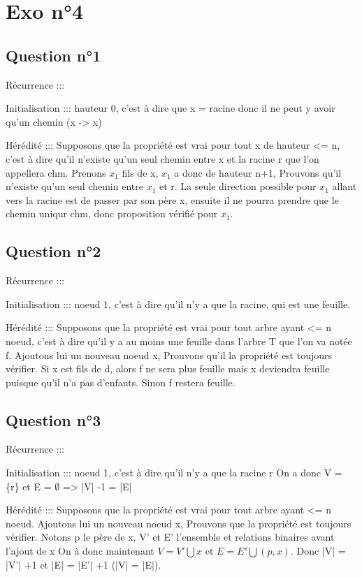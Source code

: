 \documentclass[11pt]{article}
\begin{document}
\section{Exo n°4}
\label{sec:org3d7c0b2}

\subsection{Question n°1}
\label{sec:org38a40ae}

Récurrence ::: 

Initialisation :::
hauteur 0, c'est à dire que x = racine donc il ne peut y avoir qu'un chemin (x -> x)

Hérédité :::
Supposons que la propriété est vrai pour tout x de hauteur <= n, c'est à dire qu'il n'existe qu'un seul chemin entre x et la racine r que l'on appellera chm.
Prenons \(x_1\) fils de x, \(x_1\) a donc de hauteur n+1, Prouvons qu'il n'existe qu'un seul chemin entre \(x_1\) et r.
La seule direction possible pour \(x_1\) allant vers la racine est de passer par son père x, ensuite il ne pourra prendre que le chemin uniqur chm, donc proposition vérifié pour \(x_1\).

\subsection{Question n°2}
\label{sec:org59f252b}

Récurrence ::: 

Initialisation :::
noeud 1, c'est à dire qu'il n'y a que la racine, qui est une feuille.

Hérédité :::
Supposons que la propriété est vrai pour tout arbre ayant <= n noeud, c'est à dire qu'il y a au moins une feuille dans l'arbre T que l'on va notée f.
Ajoutons lui un nouveau noeud x, Prouvons qu'il la propriété est toujours vérifier.
Si x est fils de d, alors f ne sera plus feuille mais x deviendra feuille puisque qu'il n'a pas d'enfants. Sinon f restera feuille. 

\subsection{Question n°3}
\label{sec:org91be3b2}

Récurrence ::: 

Initialisation :::
noeud 1, c'est à dire qu'il n'y a que la racine r
On a donc V = \{r\} et E = \(\emptyset\) => |V| -1 = |E|

Hérédité :::
Supposons que la propriété est vrai pour tout arbre ayant <= n noeud.
Ajoutons lui un nouveau noeud x, Prouvons que la propriété est toujours vérifier.
Notons p le père de x, V' et E' l'ensemble et relations binaires avant l'ajout de x
On à donc maintenant \(V = V' \bigcup {x}\) et \(E = E' \bigcup (p,x)\).
Donc |V| = |V'| +1 et |E| = |E'| +1 (|V| = |E|).    
\end{document}
